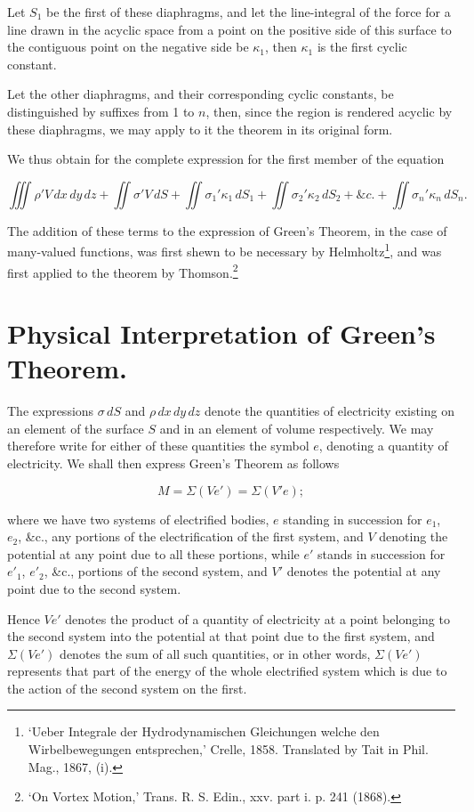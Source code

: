 \documentclass[11pt,a4paper]{article}
\begin{document}
\setcounter{footnote}{0}
Let $S_1$ be the first of these diaphragms, and let the line-integral of the force for a line drawn in the acyclic space from a point on the positive side of this surface to the contiguous point on the negative side be $\kappa_1$, then $\kappa_1$ is the first cyclic constant.

Let the other diaphragms, and their corresponding cyclic constants, be distinguished by suffixes from 1 to $n$, then, since the region is rendered acyclic by these diaphragms, we may apply to it the theorem in its original form.

We thus obtain for the complete expression for the first member of the equation

\[
\iiint \rho' V \, dx \, dy \, dz + \iint \sigma' V \, dS + \iint \sigma_1' \kappa_1 \, dS_1 + \iint \sigma_2' \kappa_2 \, dS_2 + \&c. + \iint \sigma_n' \kappa_n \, dS_n.
\]

The addition of these terms to the expression of Green's Theorem, in the case of many-valued functions, was first shewn to be necessary by Helmholtz\footnote{`Ueber Integrale der Hydrodynamischen Gleichungen welche den Wirbelbewegungen entsprechen,' Crelle, 1858. Translated by Tait in Phil. Mag., 1867, (i).}, and was first applied to the theorem by Thomson.\footnote{`On Vortex Motion,' Trans. R. S. Edin., xxv. part i. p. 241 (1868).}

\section*{Physical Interpretation of Green's Theorem.}

The expressions $\sigma\,dS$ and $\rho\,dx\,dy\,dz$ denote the quantities of electricity existing on an element of the surface $S$ and in an element of volume respectively. We may therefore write for either of these quantities the symbol $e$, denoting a quantity of electricity. We shall then express Green's Theorem as follows

\[
M = \Sigma (Ve') = \Sigma (V'e);
\]

where we have two systems of electrified bodies, $e$ standing in succession for $e_1$, $e_2$, \&c., any portions of the electrification of the first system, and $V$ denoting the potential at any point due to all these portions, while $e'$ stands in succession for $e'_1$, $e'_2$, \&c., portions of the second system, and $V'$ denotes the potential at any point due to the second system.

Hence $Ve'$ denotes the product of a quantity of electricity at a point belonging to the second system into the potential at that point due to the first system, and $\Sigma(Ve')$ denotes the sum of all such quantities, or in other words, $\Sigma(Ve')$ represents that part of the energy of the whole electrified system which is due to the action of the second system on the first.
\end{document}

